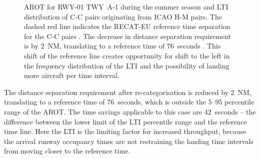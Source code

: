 \begin{figure}[h]
    \caption[AROT for RWY~01 and LTI of C-C pairs from ICAO H-M pairs]{AROT for RWY-01 TWY~A-1 during the summer season and LTI distribution of C-C pairs originating from ICAO H-M pairs. The dashed red line indicates the RECAT-EU reference time separation for the C-C pairs \protect{}. The decrease in distance separation requirement is by 2~NM, translating to a reference time of 76~seconds \protect{}. This shift of the reference line creates opportunity for shift to the left in the frequency distribution of the LTI and the possibility of landing more aircraft per time interval.}\label{fig:best_CC_from_HM_pairs_time_sep}
\end{figure}
The distance separation requirement after re-categorisation is reduced by 2~NM, translating to a reference time of 76~seconds, which is outside the 5--95 percentile range of the AROT. The time savings applicable to this case are 42~seconds -- the difference between the lower limit of the LTI percentile range and the reference time line. Here the LTI is the limiting factor for increased throughput, because the arrival runway occupancy times are not restraining the landing time intervals from moving closer to the reference time.

